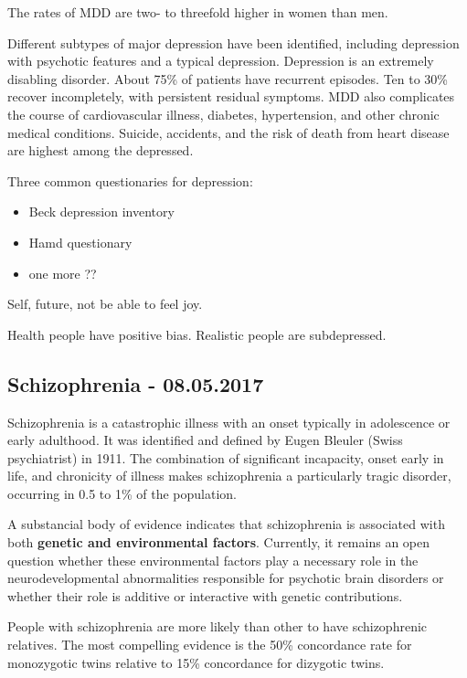\documentclass[12pt,article,oneside,a4paper]{memoir}
\begin{document}
The rates of MDD are two- to threefold higher in women than men.

Different subtypes of major depression have been identified, including
depression with psychotic features and a typical depression.
Depression is an extremely disabling disorder. About 75\% of patients have
recurrent episodes. Ten to 30\% recover incompletely, with persistent residual
symptoms. MDD also complicates the course of cardiovascular illness, diabetes,
hypertension, and other chronic medical conditions. Suicide, accidents, and the
risk of death from heart disease are highest among the depressed.

Three common questionaries for depression:
\begin{itemize}
\item Beck depression inventory
\item Hamd questionary
\item one more ??
\end{itemize}

Self, future, not be able to feel joy.

Health people have positive bias. Realistic people are subdepressed.

\newpage
\subsection{Schizophrenia - 08.05.2017}

Schizophrenia is a catastrophic illness with an onset typically in adolescence 
or early adulthood. It was identified and defined by Eugen Bleuler (Swiss
psychiatrist) in 1911. The combination of significant incapacity, onset early
in life, and chronicity of illness makes schizophrenia a particularly tragic
disorder, occurring in 0.5 to 1\% of the population.

A substancial body of evidence indicates that schizophrenia is associated with
both \textbf{genetic and environmental factors}. Currently, it remains an open
question whether these environmental factors play a necessary role in the
neurodevelopmental abnormalities responsible for psychotic brain disorders or
whether their role is additive or interactive with genetic contributions.

People with schizophrenia are more likely than other to have schizophrenic
relatives. The most compelling evidence is the 50\% concordance rate for
monozygotic twins relative to 15\% concordance for dizygotic twins.
\end{document}
